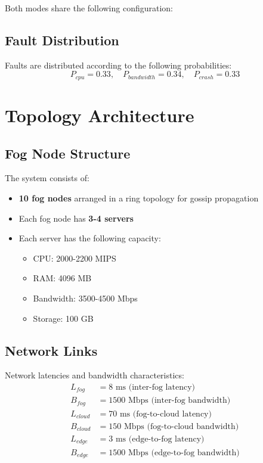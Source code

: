 \documentclass[12pt,a4paper]{article}
\begin{document}
Both modes share the following configuration:

\subsection{Fault Distribution}

Faults are distributed according to the following probabilities:
\begin{equation}
    P_{cpu} = 0.33, \quad P_{bandwidth} = 0.34, \quad P_{crash} = 0.33
\end{equation}

\section{Topology Architecture}

\subsection{Fog Node Structure}

The system consists of:
\begin{itemize}
    \item \textbf{10 fog nodes} arranged in a ring topology for gossip propagation
    \item Each fog node has \textbf{3-4 servers}
    \item Each server has the following capacity:
    \begin{itemize}
        \item CPU: 2000-2200 MIPS
        \item RAM: 4096 MB
        \item Bandwidth: 3500-4500 Mbps
        \item Storage: 100 GB
    \end{itemize}
\end{itemize}

\subsection{Network Links}

Network latencies and bandwidth characteristics:
\begin{align}
    L_{fog} &= 8 \text{ ms (inter-fog latency)} \\
    B_{fog} &= 1500 \text{ Mbps (inter-fog bandwidth)} \\
    L_{cloud} &= 70 \text{ ms (fog-to-cloud latency)} \\
    B_{cloud} &= 150 \text{ Mbps (fog-to-cloud bandwidth)} \\
    L_{edge} &= 3 \text{ ms (edge-to-fog latency)} \\
    B_{edge} &= 1500 \text{ Mbps (edge-to-fog bandwidth)}
\end{align}
\end{document}
